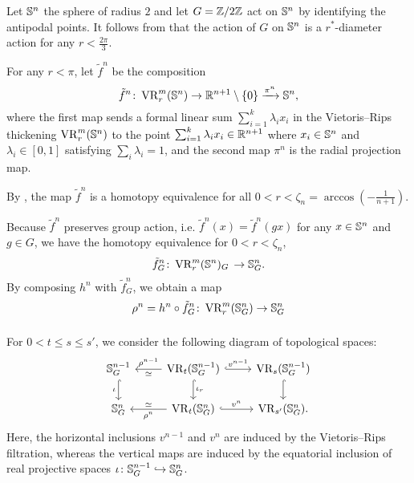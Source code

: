 \subsubsection{}

Let $\mathbb{S}^n$ the sphere of radius $2$ and let $G=\mathbb{Z}/2\mathbb{Z}$ act on $\mathbb{S}^n$ by identifying the antipodal points.
It follows from \cite[Corollary]{adams2022metric} that the action of $G$ on $\mathbb{S}^n$ is a $r^*$-diameter action for any $r<\tfrac{2\pi}{3}$.

For any $r<\pi$, let $\tilde{f}^n$ be the composition
\[
    \tilde{f}^n \colon \operatorname{VR}_r^m(\mathbb{S}^n) \to \mathbb{R}^{n+1} \setminus \{0\} \xrightarrow{\pi^n} \mathbb{S}^n,
\]
where the first map sends a formal linear sum $\sum_{i=1}^k \lambda_i x_i$ in the Vietoris--Rips thickening $\operatorname{VR}_r^m(\mathbb{S}^n)$ to the point $\sum_{i=1}^k \lambda_i x_i \in \mathbb{R}^{n+1}$ where $x_i \in \mathbb{S}^n$ and $\lambda_i \in [0,1]$ satisfying $\sum_i\lambda_i=1$, and the second map $\pi^n$ is the radial projection map.

By \cite[Proposition 5.3]{adamaszek2018metric}, the map $\tilde{f}^n$ is a homotopy equivalence for all $0<r<\zeta_n=\arccos{(-\tfrac{1}{n+1})}$.


Because $\tilde{f}^n$ preserves group action, i.e. $\tilde{f}^n(x) = \tilde{f}^n(gx)$ for any $x\in \mathbb{S}^n$ and $g\in G$, we have the homotopy equivalence for $0<r<\zeta_n$, %
\[
\tilde{f}^n_G \colon 
\operatorname{VR}_r^m(\mathbb{S}^n)_G \, 
\to \mathbb{S}^n_G.
\]
By composing $h^n$ with $\tilde{f}^n_G$, we obtain a map 
\[
\rho^n = h^n \circ \tilde{f}^n_G 
\colon \operatorname{VR}_r^m(\mathbb{S}^n_G) \to \mathbb{S}^n_G
\]

\subsubsection{} 

For $0<t\leq s \leq s'$, we consider the following diagram of topological spaces:
\begin{equation}\label{d:fundamental_bars_diagram}
    \begin{tikzcd}
        \bS^{n-1}_G
        \ar[d, hook,"{\iota}" left]
        &
        \VR_t(\bS^{n-1}_G)
        \ar[d, hook,"\iota_r"]
        \ar[l, "\rho^{n-1}" above, "\simeq" below]
        \ar[r, hook, "v^{n-1}"]
        &
        \VR_{s}(\bS^{n-1}_G)
        \ar[d, hook]
        \\
        \bS^{n}_G
        &
        \VR_t(\bS^{n}_G)
        \ar[l, "\rho^n" below, "\simeq" above]
        \ar[r, hook, "v^{n}"]
        &
        \VR_{s'}(\bS^{n}_G).
    \end{tikzcd}
\end{equation}
Here, the horizontal inclusions $v^{n-1}$ and $v^n$ are induced by the Vietoris--Rips filtration, whereas the vertical maps are induced by the equatorial inclusion of real projective spaces $\iota \colon \mathbb{S}^{n-1}_G \hookrightarrow \mathbb{S}^{n}_G$.

